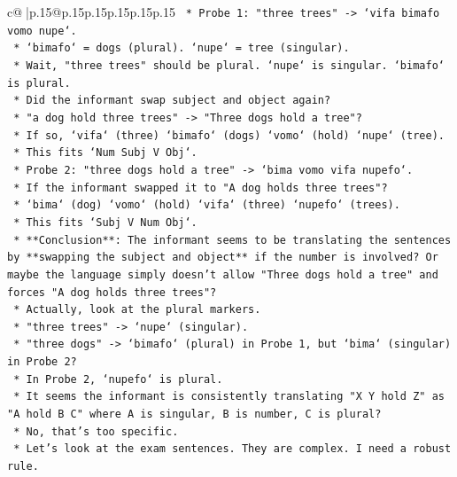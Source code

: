 \documentclass{article}
\begin{document}
{\begin{supertabular}{c@{$\;$}|p{.15\linewidth}@{}p{.15\linewidth}p{.15\linewidth}p{.15\linewidth}p{.15\linewidth}p{.15\linewidth}}
{{{\texttt{                    *   Probe 1: "three trees" {-}> `vifa bimafo vomo nupe`.} \\
\texttt{                        *   `bimafo` = dogs (plural). `nupe` = tree (singular).} \\
\texttt{                        *   Wait, "three trees" should be plural. `nupe` is singular. `bimafo` is plural.} \\
\texttt{                        *   Did the informant swap subject and object again?} \\
\texttt{                        *   "a dog hold three trees" {-}> "Three dogs hold a tree"?} \\
\texttt{                        *   If so, `vifa` (three) `bimafo` (dogs) `vomo` (hold) `nupe` (tree).} \\
\texttt{                        *   This fits `Num Subj V Obj`.} \\
\texttt{                    *   Probe 2: "three dogs hold a tree" {-}> `bima vomo vifa nupefo`.} \\
\texttt{                        *   If the informant swapped it to "A dog holds three trees"?} \\
\texttt{                        *   `bima` (dog) `vomo` (hold) `vifa` (three) `nupefo` (trees).} \\
\texttt{                        *   This fits `Subj V Num Obj`.} \\
\texttt{            *   **Conclusion**: The informant seems to be translating the sentences by **swapping the subject and object** if the number is involved? Or maybe the language simply doesn't allow "Three dogs hold a tree" and forces "A dog holds three trees"?} \\
\texttt{            *   Actually, look at the plural markers.} \\
\texttt{                *   "three trees" {-}> `nupe` (singular).} \\
\texttt{                *   "three dogs" {-}> `bimafo` (plural) in Probe 1, but `bima` (singular) in Probe 2?} \\
\texttt{                *   In Probe 2, `nupefo` is plural.} \\
\texttt{                *   It seems the informant is consistently translating "X Y hold Z" as "A hold B C" where A is singular, B is number, C is plural?} \\
\texttt{                *   No, that's too specific.} \\
\texttt{            *   Let's look at the exam sentences. They are complex. I need a robust rule.} \\
}}}
\end{supertabular}}
\end{document}
